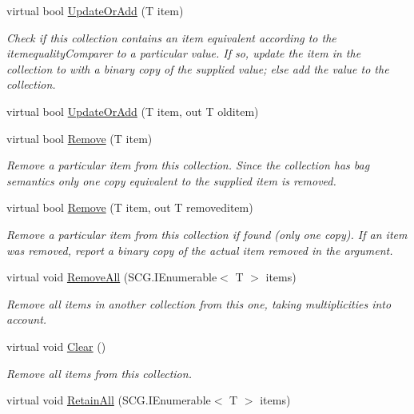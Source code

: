 \begin{DoxyCompactItemize}
virtual bool \hyperlink{class_c5_1_1_linked_list_a1e0548801ebf49f8d9d9d26394a7676c}{Update\+Or\+Add} (T item)
\begin{DoxyCompactList}\small\item\em Check if this collection contains an item equivalent according to the itemequality\+Comparer to a particular value. If so, update the item in the collection to with a binary copy of the supplied value; else add the value to the collection. \end{DoxyCompactList}\item 
virtual bool \hyperlink{class_c5_1_1_linked_list_a248122a0d20dfd89e8e7e9a84062405d}{Update\+Or\+Add} (T item, out T olditem)
\item 
virtual bool \hyperlink{class_c5_1_1_linked_list_a16561b02cc72e8d8191c32a84af13d81}{Remove} (T item)
\begin{DoxyCompactList}\small\item\em Remove a particular item from this collection. Since the collection has bag semantics only one copy equivalent to the supplied item is removed. \end{DoxyCompactList}\item 
virtual bool \hyperlink{class_c5_1_1_linked_list_a37bbd34f4ba9f1771ebd0854f1b5037a}{Remove} (T item, out T removeditem)
\begin{DoxyCompactList}\small\item\em Remove a particular item from this collection if found (only one copy). If an item was removed, report a binary copy of the actual item removed in the argument. \end{DoxyCompactList}\item 
virtual void \hyperlink{class_c5_1_1_linked_list_a9f346a6bf713cae5170ee71e662918cc}{Remove\+All} (S\+C\+G.\+I\+Enumerable$<$ T $>$ items)
\begin{DoxyCompactList}\small\item\em Remove all items in another collection from this one, taking multiplicities into account. \end{DoxyCompactList}\item 
virtual void \hyperlink{class_c5_1_1_linked_list_a936ee524a650660d23b62ff74ae306d9}{Clear} ()
\begin{DoxyCompactList}\small\item\em Remove all items from this collection. \end{DoxyCompactList}\item 
virtual void \hyperlink{class_c5_1_1_linked_list_af59cb7a4dbffd061ffc577a34021db1c}{Retain\+All} (S\+C\+G.\+I\+Enumerable$<$ T $>$ items)

\end{DoxyCompactItemize}

